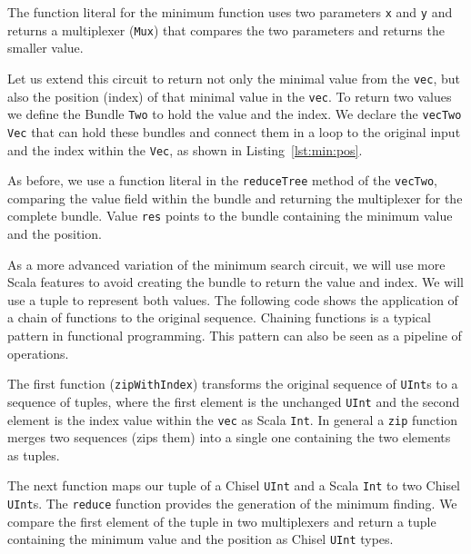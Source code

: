 \documentclass[%
    10pt,
    headinclude, footexclude,
    openright, %
    notitlepage,
    cleardoubleempty,
    headsepline,
    pointlessnumbers,
    bibtotoc, idxtotoc,
    ]{scrbook}
\newcommand{\code}[1]{{\lstinline[basicstyle=\small\ttfamily]{#1}}}
\begin{document}
The function literal for the minimum function uses two parameters \code{x} and \code{y}
and returns a multiplexer (\code{Mux}) that compares the two parameters and returns the smaller
value.


Let us extend this circuit to return not only the minimal value from the \code{vec}, but also the
position (index) of that minimal value in the \code{vec}. To return two values we define the Bundle \code{Two} to
hold the value and the index. We declare the \code{vecTwo} \code{Vec} that can hold these bundles
and connect them in a loop to the original input and the index within the \code{Vec}, as shown
in Listing~\ref{lst:min:pos}.

As before, we use a function literal in the \code{reduceTree} method of the \code{vecTwo},
comparing the value field within the bundle and returning the multiplexer for the
complete bundle.
Value \code{res} points to the bundle containing the minimum value and the position.



As a more advanced variation of the minimum search circuit, we will use more Scala features
to avoid creating the bundle to return the value
and index. We will use a tuple to represent both values.
The following code shows the application
of a chain of functions to the original sequence. Chaining functions is a typical pattern in functional programming.
This pattern can also be seen as a pipeline of operations.


The first function (\code{zipWithIndex})
transforms the original sequence of \code{UInt}s to a sequence of tuples, where the first element is the
unchanged \code{UInt} and the second element is the index value within the \code{vec} as Scala \code{Int}.
In general a \code{zip} function merges two sequences (zips them) into a single one
containing the two elements as tuples.

The next function maps our tuple of a Chisel \code{UInt}
and a Scala \code{Int} to two Chisel \code{UInt}s. The \code{reduce} function provides the generation of
the minimum finding. We compare the first element of the tuple in two multiplexers and return
a tuple containing the minimum value and the position as Chisel \code{UInt} types.
\end{document}
